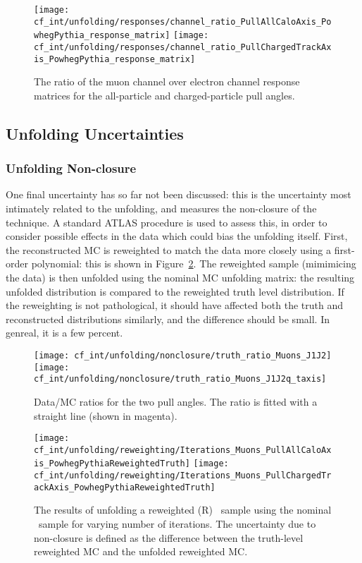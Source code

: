 \begin{figure}
  \texttt{[image: cf\_int/unfolding/responses/channel\_ratio\_PullAllCaloAxis\_PowhegPythia\_response\_matrix]}
  \texttt{[image: cf\_int/unfolding/responses/channel\_ratio\_PullChargedTrackAxis\_PowhegPythia\_response\_matrix]}
  \caption{The ratio of the muon channel over electron channel response matrices
    for the all-particle and charged-particle pull angles.}
  \label{fig:color::unfolding:response_channel_comp}
\end{figure}

	\subsection{Unfolding Uncertainties}
	\label{chapter:color:unfolding:uncertainties}

	\subsubsection{Unfolding Non-closure}

	One final uncertainty has so far not been discussed: this is the uncertainty most intimately related to the unfolding, and measures the non-closure of the technique. A standard ATLAS procedure is used to assess this, in order to consider possible effects in the data which could bias the unfolding itself. First, the reconstructed MC is reweighted to match the data more closely using a first-order polynomial: this is shown in Figure~\ref{fig:color:unfolding:datamc_ratio}. The reweighted sample (mimimicing the data) is then unfolded using the nominal MC unfolding matrix: the resulting unfolded distribution is compared to the reweighted truth level distribution. If the reweighting is not pathological, it should have affected both the truth and reconstructed distributions similarly, and the difference should be small. In genreal, it is a few percent.

\begin{figure}[h!]
  \texttt{[image: cf\_int/unfolding/nonclosure/truth\_ratio\_Muons\_J1J2]}
  \texttt{[image: cf\_int/unfolding/nonclosure/truth\_ratio\_Muons\_J1J2q\_taxis]}
  \caption{Data/MC ratios for the two pull angles. The ratio is fitted with a
    straight line (shown in magenta).}
  \label{fig:color:unfolding:datamc_ratio}
\end{figure}

\begin{figure}[h!]
  \texttt{[image: cf\_int/unfolding/reweighting/Iterations\_Muons\_PullAllCaloAxis\_PowhegPythiaReweightedTruth]}
  \texttt{[image: cf\_int/unfolding/reweighting/Iterations\_Muons\_PullChargedTrackAxis\_PowhegPythiaReweightedTruth]}
  \caption{The results of unfolding a reweighted (R) \PowPythia\ sample using
    the nominal \PowPythia\ sample for varying number of iterations.
    The uncertainty due to non-closure is defined as the difference
    between the truth-level reweighted MC and the unfolded reweighted MC.}
  \label{fig:color:unfolding:nonclosure}
\end{figure}


